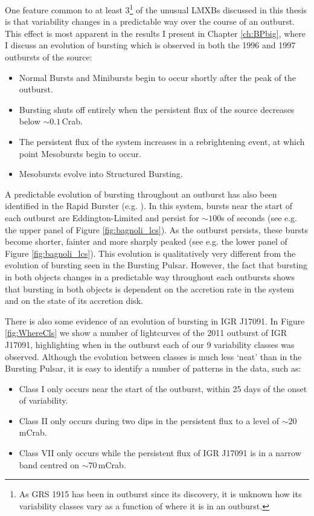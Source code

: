 \par One feature common to at least 3\footnote{As GRS 1915 has been in outburst since its discovery, it is unknown how its variability classes vary as a function of where it is in an outburst.} of the unusual LMXBs discussed in this thesis is that variability changes in a predictable way over the course of an outburst.  This effect is most apparent in the results I present in Chapter \ref{ch:BPbig}, where I discuss an evolution of bursting which is observed in both the 1996 and 1997 outbursts of the source:
\begin{itemize}
\item Normal Bursts and Minibursts begin to occur shortly after the peak of the outburst.
\item Bursting shuts off entirely when the persistent flux of the source decreases below $\sim0.1$\,Crab.
\item The persistent flux of the system increases in a rebrightening event, at which point Mesobursts begin to occur.
\item Mesobursts evolve into Structured Bursting.
\end{itemize}
\par A predictable evolution of bursting throughout an outburst has also been identified in the Rapid Burster (e.g. \citealp{Bagnoli_PopStudy}).  In this system, bursts near the start of each outburst are Eddington-Limited and persist for $\sim100$s of seconds (see e.g. the upper panel of Figure \ref{fig:bagnoli_lcs}).  As the outburst persists, these bursts become shorter, fainter and more sharply peaked (see e.g. the lower panel of Figure \ref{fig:bagnoli_lcs}).  This evolution is qualitatively very different from the evolution of bursting seen in the Bursting Pulsar.  However, the fact that bursting in both objects changes in a predictable way throughout each outbursts shows that bursting in both objects is dependent on the accretion rate in the system and on the state of its accretion disk.
\par There is also some evidence of an evolution of bursting in IGR J17091.  In Figure \ref{fig:WhereCls} we show a number of lightcurves of the 2011 outburst of IGR J17091, highlighting when in the outburst each of our 9 variability classes was observed.  Although the evolution between classes is much less `neat' than in the Bursting Pulsar, it is easy to identify a number of patterns in the data, such as:
\begin{itemize}
\item Class I only occurs near the start of the outburst, within 25 days of the onset of variability.
\item Class II only occurs during two dips in the persistent flux to a level of $\sim20$\,mCrab.
\item Class VII only occurs while the persistent flux of IGR J17091 is in a narrow band centred on $\sim70$\,mCrab.
\end{itemize}
